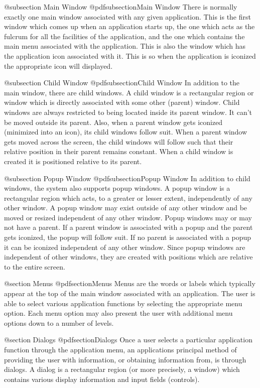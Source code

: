 @subsection Main Window
@pdfsubsection{Main Window}
There is normally exactly one main window associated with any given
application.  This is the first window which comes up when an application
starts up, the one which acts as the fulcrum for all the facilities of
the application, and the one which contains the main menu associated with
the application.  This is also the window which has the application icon
associated with it.  This is so when the application is iconized the
appropriate icon will displayed.

@subsection Child Window
@pdfsubsection{Child Window}
In addition to the main window, there are child windows.  A child window
is a rectangular region or window which is directly associated with
some other (parent) window.  Child windows are always restricted to being
located inside its parent window.  It can't be moved outside its parent.
Also, when a parent window gets iconized (minimized into an icon), its
child windows follow suit.  When a parent window gets moved across the
screen, the child windows will follow such that their relative position
in their parent remains constant.  When a child window is created it
is positioned relative to its parent.  

@subsection Popup Window
@pdfsubsection{Popup Window}
In addition to child windows, the system also supports popup windows.  A
popup window is a rectangular region which acts, to a greater or lesser
extent, independently of any other window.  A popup window may exist
outside of any other window and be moved or resized independent of any
other window.  Popup windows may or may not have a parent.  If a parent
window is associated with a popup and the parent gets iconized, the
popup will follow suit.  If no parent is associated with a popup it can
be iconized independent of any other window.  Since popup windows are
independent of other windows, they are created with positions which are
relative to the entire screen.

@section Menus
@pdfsection{Menus}
Menus are the words or labels which typically appear at the top of the
main window associated with an application.  The user is able to select
various application functions by selecting the appropriate menu option.
Each menu option may also present the user with additional menu options
down to a number of levels.

@section Dialogs
@pdfsection{Dialogs}
Once a user selects a particular application function through the
application menu, an applications principal method of providing the user
with information, or obtaining information from, is through dialogs.  A
dialog is a rectangular region (or more precisely, a window) which
contains various display information and input fields (controls).

